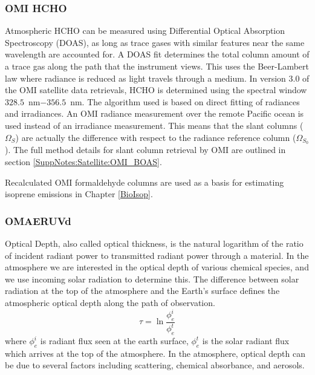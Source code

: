     \subsubsection{OMI HCHO}
      \label{Model:Datasets:OMHCHO}
      
      Atmospheric HCHO can be measured using Differential Optical Absorption Spectroscopy (DOAS), as long as trace gases with similar features near the same wavelength are accounted for.
      A DOAS fit determines the total column amount of a trace gas along the path that the instrument views.
      This uses the Beer-Lambert law where radiance is reduced as light travels through a medium.
      In version 3.0 of the OMI satellite data retrievals, HCHO is determined using the spectral window $328.5$~nm$ - 356.5$~nm. 
      The algorithm used is based on direct fitting of radiances and irradiances.
      An OMI radiance measurement over the remote Pacific ocean is used instead of an irradiance measurement.
      This means that the slant columns ($\Omega_S$) are actually the difference with respect to the radiance reference column ($\Omega_{S_0}$).
      The full method details for slant column retrieval by OMI are outlined in section \ref{SuppNotes:Satellite:OMI_BOAS}.
      
      Recalculated OMI formaldehyde columns are used as a basis for estimating isoprene emissions in Chapter \ref{BioIsop}.
    
    \subsubsection{OMAERUVd}
      
      Optical Depth, also called optical thickness, is the natural logarithm of the ratio of incident radiant power to transmitted radiant power through a material.
      In the atmosphere we are interested in the optical depth of various chemical species, and we use incoming solar radiation to determine this.
      The difference between solar radiation at the top of the atmosphere and the Earth's surface defines the atmospheric optical depth along the path of observation.
      \begin{equation*}
        \tau = \ln{\frac{\phi_e^i}{\phi_e^t}}
      \end{equation*}
      where $\phi_e^i$ is radiant flux seen at the earth surface, $\phi_e^t$ is the solar radiant flux which arrives at the top of the atmosphere.
      In the atmosphere, optical depth can be due to several factors including scattering, chemical absorbance, and aerosols.
      
